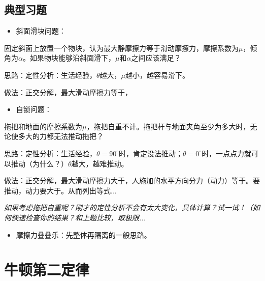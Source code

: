 \documentclass[a4paper,9pt]{ctexart}
\begin{document}
\subsection{典型习题}
\begin{itemize}
\item
斜面滑块问题：
\end{itemize}
\begin{eg}
固定斜面上放置一个物块，认为最大静摩擦力等于滑动摩擦力，摩擦系数为$\mu$，倾角为$\alpha$。如果物块能够沿斜面滑下，$\mu$和$\alpha$之间应该满足？
\end{eg}
\begin{ans}
思路：定性分析：生活经验，$\theta$越大，$\mu$越小，越容易滑下。\par
做法：正交分解，最大滑动摩擦力等于\hspace{4cm}，
\vspace{5cm}
\end{ans}
\begin{itemize}
\item
自锁问题：
\end{itemize}
\begin{eg}
拖把和地面的摩擦系数为$\mu$，拖把自重不计。拖把杆与地面夹角至少为多大时，无论使多大的力都无法推动拖把？
\end{eg}
\begin{ans}
思路：定性分析：生活经验，$\theta = 90^\circ$时，肯定没法推动；$\theta = 0^\circ$时，一点点力就可以推动（为什么？）\so $\theta$越大，越难推动。\par
做法：正交分解，最大滑动摩擦力大于\hspace{4cm}，人施加的水平方向分力（动力）等于\hspace{4cm}。要推动，动力要大于\hspace{4cm}。从而列出等式...
\vspace{5cm}
\end{ans}
\emph{如果考虑拖把自重呢？刚才的定性分析不会有太大变化，具体计算？试一试！（如何快速检查你的结果？和上题比较，取极限...}
\vspace{7cm}
\begin{itemize}
\item
摩擦力叠叠乐：先整体再隔离的一般思路。
\end{itemize}

\newpage
\section{牛顿第二定律}
\end{document}
